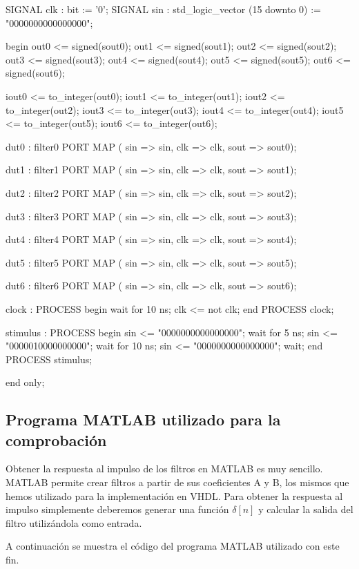 \documentclass[a4paper,12pt]{report}
\begin{document}
\begin{vhdlcode}
SIGNAL clk   : bit := '0';
SIGNAL sin  : std_logic_vector (15 downto 0) 
            := "0000000000000000";

begin
out0 <= signed(sout0);
out1 <= signed(sout1);
out2 <= signed(sout2);
out3 <= signed(sout3);
out4 <= signed(sout4);
out5 <= signed(sout5);
out6 <= signed(sout6);

iout0 <= to_integer(out0);
iout1 <= to_integer(out1);
iout2 <= to_integer(out2);
iout3 <= to_integer(out3);
iout4 <= to_integer(out4);
iout5 <= to_integer(out5);
iout6 <= to_integer(out6);

dut0 : filter0 
   PORT MAP (
   sin => sin,
   clk => clk,
   sout => sout0);

dut1 : filter1 
   PORT MAP (
   sin => sin,
   clk => clk,
   sout => sout1);

dut2 : filter2 
   PORT MAP (
   sin => sin,
   clk => clk,
   sout => sout2);

dut3 : filter3 
   PORT MAP (
   sin => sin,
   clk => clk,
   sout => sout3);
   
dut4 : filter4
   PORT MAP (
     sin => sin,
     clk => clk,
     sout => sout4);

dut5 : filter5
   PORT MAP (
   sin => sin,
   clk => clk,
   sout => sout5);

dut6 : filter6 
   PORT MAP (
   sin => sin,
   clk => clk,
   sout => sout6);

clock : PROCESS
   begin
   wait for 10 ns; clk  <= not clk;
end PROCESS clock;

stimulus : PROCESS
   begin
   sin <= "0000000000000000";
   wait for 5 ns; sin  <= "0000010000000000";
   wait for 10 ns; sin  <= "0000000000000000";
   wait;
end PROCESS stimulus;

end only;
\end{vhdlcode}
\clearpage

\subsection{Programa MATLAB utilizado para la comprobación}
Obtener la respuesta al impulso de los filtros en MATLAB es muy sencillo. MATLAB permite crear filtros a partir de sus coeficientes A y B, los mismos que hemos utilizado para la implementación en VHDL. Para obtener la respuesta al impulso simplemente deberemos generar una función $\delta[n]$ y calcular la salida del filtro utilizándola como entrada.

A continuación se muestra el código del programa MATLAB utilizado con este fin.
\end{document}
